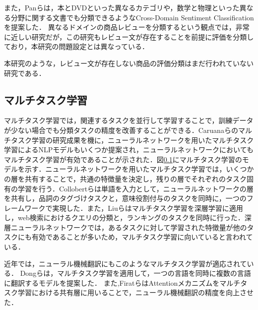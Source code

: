 \documentclass[dvipdfmx,twocolumn,10.5pt]{jsarticle}
\begin{document}
また，Panらは，本とDVDといった異なるカテゴリや，数学と物理といった異なる分野に関する文書でも分類できるようなCross-Domain Sentiment Classificationを提案した．\cite{pan2010cross}
異なるドメインの商品レビューを分類するという観点では，非常に近しい研究だが，この研究もレビュー文が存在することを前提に評価を分類しており，本研究の問題設定とは異なっている．

本研究のような，レビュー文が存在しない商品の評価分類はまだ行われていない研究である．


\subsection{マルチタスク学習}\label{multitask_learning}
マルチタスク学習では，関連するタスクを並行して学習することで，訓練データが少ない場合でも分類タスクの精度を改善することができる．Caruanaらのマルチタスク学習の研究成果\cite{caruana1997multitask}を機に，ニューラルネットワークを用いたマルチタスク学習によるNLPモデルもいくつか提案され，ニューラルネットワークにおいてもマルチタスク学習が有効であることが示された．図\ref{multitask_learning}にマルチタスク学習のモデルを示す．ニューラルネットワークを用いたマルチタスク学習では，いくつかの層を共有することで，共通の特徴量を決定し，残りの層でそれぞれのタスク固有の学習を行う．Collobertらは単語を入力として，ニューラルネットワークの層を共有し，品詞のタグづけタスクと，意味役割付与のタスクを同時に，一つのフレームワークで実現した．\cite{collobert2008unified}また，Liuらはマルチタスク学習を深層学習に適用し，web検索におけるクエリの分類と，ランキングのタスクを同時に行った．\cite{liu2015representation}深層ニューラルネットワークでは，あるタスクに対して学習された特徴量が他のタスクにも有効であることが多いため，マルチタスク学習に向いていると言われている．

近年では，ニューラル機械翻訳にもこのようなマルチタスク学習が適応されている．
Dongらは，マルチタスク学習を適用して，一つの言語を同時に複数の言語に翻訳するモデルを提案した．\cite{dong2015multi}
また,FiratらはAttentionメカニズムをマルチタスク学習における共有層に用いることで，ニューラル機械翻訳の精度を向上させた．\cite{firat2016multi}

\end{document}
